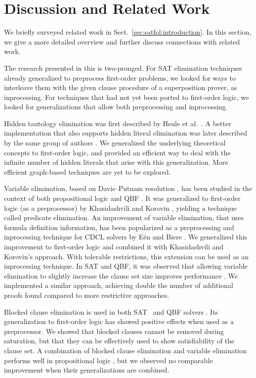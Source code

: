 \section{Discussion and Related Work}
\label{sec:satfol:discussion-and-related-work}

We briefly surveyed related work in Sect.~\ref{sec:satfol:introduction}. In this
section, we give a more detailed overview and further discuss connections with
related work.

The research presented in this \paper{} is two-pronged. For SAT elimination
techniques already generalized to preprocess first-order problems, we looked for
ways to interleave them with the given clause procedure of a superposition
prover, as inprocessing. For techniques that had not yet been ported to
first-order logic, we looked for generalizations that allow both preprocessing and
inprocessing.

Hidden tautology elimination was first described
by Heule et al.\ \cite{hjb-2010-cl-elim}. A better implementation that also
supports hidden literal elimination was later described by the same group of
authors \cite{hjb-2011-big-simplification}. We generalized the underlying
theoretical concepts to first-order logic, and provided an efficient way to deal
with the infinite number of hidden literals that arise  with this
generalization. More efficient graph-based techniques are yet to be explored.

Variable elimination, based on Davis--Putnam resolution \cite{dp-60-dp}, has been studied in
the context of both propositional logic \cite{sp-04-niver,cs-00-zres} and QBF
\cite{ab-2004-re}. It was generalized to first-order logic (as a
preprocessor) by Khasidashvili and Korovin \cite{kk-2016-pe-fol}, yielding a technique called
predicate elimination. An improvement of variable elimination,
that uses formula definition information, has been popularized as a preprocessing and
inprocessing technique for CDCL solvers by E{\'{e}}n and Biere
\cite{eb-2005-satpreprocess}. We generalized this improvement to first-order
logic and combined it with Khasidashvili and Korovin's approach. With tolerable restrictions,
this extension can be used as an inprocessing technique. In SAT and QBF, it was observed that
allowing variable elimination to slightly increase the clause set size
improves performance \cite{bls-11-bloqqer}. We implemented a similar approach,
achieving double the number of additional proofs found compared to more
restrictive approaches.

Blocked clause elimination is used in both SAT~\cite{jbh-10-BCE} and QBF
solvers \cite{bls-11-bloqqer}. Its generalization to first-order logic
\cite{ksstb-2017-blockedfol} has showed positive effects when used as a
preprocessor. We showed that blocked clauses cannot be removed during
saturation, but that they can be effectively used to show satisfiability of the
clause set. A combination of blocked clause elimination and
variable elimination performs well in propositional logic \cite{jbh-10-BCE}, but we observed no comparable
improvement when their generalizations are combined.

